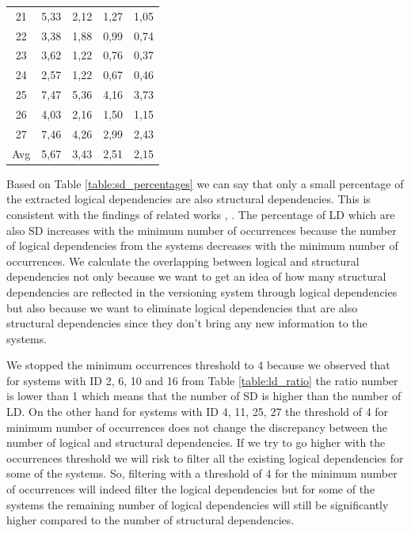 \documentclass[12pt]{mitthesis}
\begin{document}
\begin{table}[H]
\begin{tabular}{|c|c|c|c|c|}
21	&	5,33	&	2,12	&	1,27	&	1,05	\\
22	&	3,38	&	1,88	&	0,99	&	0,74	\\
23	&	3,62	&	1,22	&	0,76	&	0,37	\\
24	&	2,57	&	1,22	&	0,67	&	0,46	\\
25	&	7,47	&	5,36	&	4,16	&	3,73	\\
26	&	4,03	&	2,16	&	1,50	&	1,15	\\
27	&	7,46	&	4,26	&	2,99	&	2,43	\\
\hline
Avg	&	5,67	&	3,43	&	2,51	&	2,15	\\
\hline
\end{tabular}
\end{table}




Based on Table \ref{table:sd_percentages} we can say that only a small percentage of the extracted logical dependencies are also structural dependencies. This is consistent with the findings of related works \cite{DBLP:journals/jss/AjienkaC17}, \cite{DBLP:journals/ese/AjienkaCC18}. The percentage of LD which are also SD  increases with the minimum number of occurrences because the number of logical dependencies from the systems decreases with the minimum number of occurrences. 
We calculate the overlapping between logical and structural dependencies not only because we want to get an idea of how many structural dependencies are reflected in the versioning system through logical dependencies but also because we want to eliminate logical dependencies that are also structural dependencies since they don't bring any new information to the systems.

We stopped the minimum occurrences threshold to 4 because we observed that for systems with ID 2, 6, 10 and 16 from Table \ref{table:ld_ratio} the ratio number is lower than 1 which means that the number of SD is higher than the number of LD. On the other hand for systems with ID 4, 11, 25, 27 the threshold of 4 for minimum number of occurrences does not change the discrepancy between the number of logical and structural dependencies.
If we try to go higher with the occurrences threshold we will risk to filter all the existing logical dependencies for some of the systems.
So, filtering with a threshold of 4 for the minimum number of occurrences will indeed filter the logical dependencies but for some of the systems the remaining number of logical dependencies will still be significantly higher compared to the number of structural dependencies.
\end{document}
